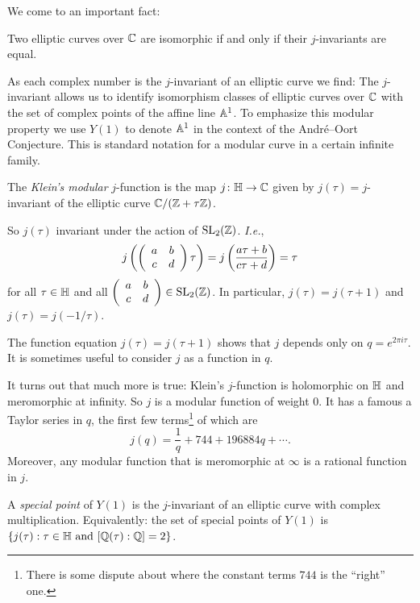 We come to an important fact:
\begin{theorem}
  Two elliptic curves over ${\mathbb{C}}$ are
  isomorphic if and only if their $j$-invariants are equal.
\end{theorem}

As each complex number is the $j$-invariant of an elliptic curve we
find: The $j$-invariant allows us to identify isomorphism classes of
elliptic curves over ${\mathbb{C}}$ with the set of complex points of the
affine line ${\mathbb{A}}^1$. To emphasize this modular property we use $Y(1)$
to denote ${\mathbb{A}}^1$ in the context of the Andr\'e--Oort Conjecture. This
is standard notation for a modular curve in a certain infinite family.

\begin{definition}
  The \emph{Klein's modular} $j$-function is the map
  $j\colon{\mathbb{H}}\rightarrow{\mathbb{C}}$ given by  $j(\tau) =
  j$-invariant of the elliptic curve ${\mathbb{C}}/({\mathbb{Z}}+\tau{\mathbb{Z}})$. 
\end{definition}
So $j(\tau)$  invariant under the action of $\mathrm{SL}_2({\mathbb{Z}})$.
\textit{I.e.}, 
\begin{equation*}
  j\left(\left( \begin{array}{cc} {a} & {b} \\ {c} & {d} \end{array} \right) \tau\right) = j\left(\frac{a\tau + b}{c\tau +d}\right) =
    \tau 
\end{equation*}
for all $\tau\in{\mathbb{H}}$ and all $\left( \begin{array}{cc} {a} & {b} \\ {c} & {d} \end{array} \right)\in
\mathrm{SL}_2({\mathbb{Z}})$.
In particular,  $j(\tau)=j(\tau+1)$ and $j(\tau) =
j(-1/\tau)$. 


The function equation $j(\tau)=j(\tau+1)$ shows that $j$ depends only
on $q=e^{2\pi i \tau}$. It is sometimes useful to consider $j$ as a
function in $q$.

It turns out that much more is true: Klein's $j$-function is
holomorphic on ${\mathbb{H}}$ and meromorphic at infinity.
So $j$ is a modular function of weight $0$.
It has a famous 
a Taylor series in $q$, the first few terms\footnote{There is some
  dispute about where the constant terms $744$ is the ``right'' one.} of which are 
\begin{equation*}
  j(q) = \frac 1q + 744 + 196884q +\cdots. 
\end{equation*}
Moreover, any modular function that is meromorphic at $\infty$ is a
rational function in $j$.

\begin{definition}
  \label{def:specialY1}
  A \emph{special point} of $Y(1)$ is the $j$-invariant of an elliptic curve
  with complex multiplication. Equivalently: the set of special points
  of $Y(1)$ is $\{j(\tau) : \tau\in{\mathbb{H}} \text{ and }[{\mathbb{Q}}(\tau):{\mathbb{Q}}]=2\}$. 
\end{definition}

